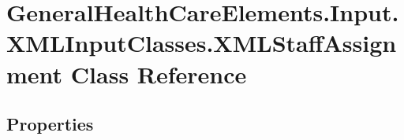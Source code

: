 \hypertarget{class_general_health_care_elements_1_1_input_1_1_x_m_l_input_classes_1_1_x_m_l_staff_assignment}{}\section{General\+Health\+Care\+Elements.\+Input.\+X\+M\+L\+Input\+Classes.\+X\+M\+L\+Staff\+Assignment Class Reference}
\label{class_general_health_care_elements_1_1_input_1_1_x_m_l_input_classes_1_1_x_m_l_staff_assignment}
\subsection*{Properties}
